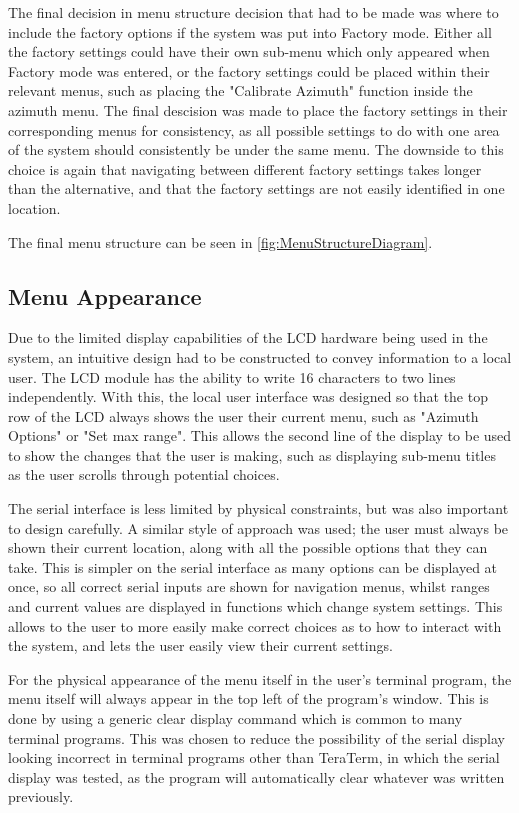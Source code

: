 \documentclass[]{report}
\begin{document}
The final decision in menu structure decision that had to be made was where to include the factory options if the system was put into Factory mode. Either all the factory settings could have their own sub-menu which only appeared when Factory mode was entered, or the factory settings could be placed within their relevant menus, such as placing the "Calibrate Azimuth" function inside the azimuth menu. The final descision was made to place the factory settings in their corresponding menus for consistency, as all possible settings to do with one area of the system should consistently be under the same menu. The downside to this choice is again that navigating between different factory settings takes longer than the alternative, and that the factory settings are not easily identified in one location. 


The final menu structure can be seen in \ref{fig:MenuStructureDiagram}.

\subsection{Menu Appearance}
Due to the limited display capabilities of the LCD hardware being used in the system, an intuitive design had to be constructed to convey information to a local user. The LCD module has the ability to write 16 characters to two lines independently. With this, the local user interface was designed so that the top row of the LCD always shows the user their current menu, such as "Azimuth Options" or "Set max range". This allows the second line of the display to be used to show the changes that the user is making, such as displaying sub-menu titles as the user scrolls through potential choices. 

The serial interface is less limited by physical constraints, but was also important to design carefully. A similar style of approach was used; the user must always be shown their current location, along with all the possible options that they can take. This is simpler on the serial interface as many options can be displayed at once, so all correct serial inputs are shown for navigation menus, whilst ranges and current values are displayed in functions which change system settings. This allows to the user to more easily make correct choices as to how to interact with the system, and lets the user easily view their current settings. 

For the physical appearance of the menu itself in the user's terminal program, the menu itself will always appear in the top left of the program's window. This is done by using a generic clear display command which is common to many terminal programs. This was chosen to reduce the possibility of the serial display looking incorrect in terminal programs other than TeraTerm, in which the serial display was tested, as the program will automatically clear whatever was written previously. 
\end{document}
